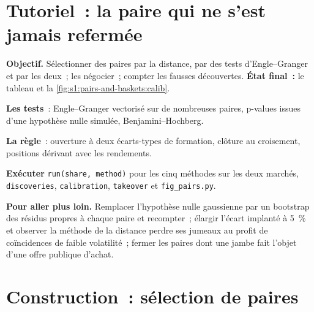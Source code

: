 \section{Tutoriel~: la paire qui ne s'est jamais refermée}\label{tut:s1:pairs-and-baskets:tut}

\begin{tutorial}
\textbf{Objectif.} Sélectionner des paires par la distance, par des tests d'Engle--Granger et par les deux~; les négocier~; compter les fausses découvertes. \textbf{État final~:} le tableau et
la \cref{fig:s1:pairs-and-baskets:calib}.
\begin{tutsteps}
\item \textbf{Les tests}~: Engle--Granger vectorisé sur de nombreuses paires, p-values issues d'une hypothèse nulle simulée, Benjamini--Hochberg.
\label{lst:s1:pairs-and-baskets:eg}
\item \textbf{La règle}~: ouverture à deux écarts-types de formation, clôture au croisement, positions dérivant avec les rendements.
\label{lst:s1:pairs-and-baskets:rule}
\item \textbf{Exécuter} \texttt{run(share, method)} pour les cinq méthodes sur les deux marchés, \texttt{discoveries}, \texttt{calibration}, \texttt{takeover} et
\texttt{fig\_pairs.py}.
\end{tutsteps}
\textbf{Pour aller plus loin.} Remplacer l'hypothèse nulle gaussienne par un bootstrap des résidus propres à chaque paire et recompter~; élargir l'écart implanté à 5~\% et observer la
méthode de la distance perdre ses jumeaux au profit de coïncidences de faible volatilité~; fermer les paires dont une jambe fait l'objet d'une offre publique d'achat.
\end{tutorial}

\section{Construction~: sélection de paires}\label{bld:s1:pairs-and-baskets:pairsel}

